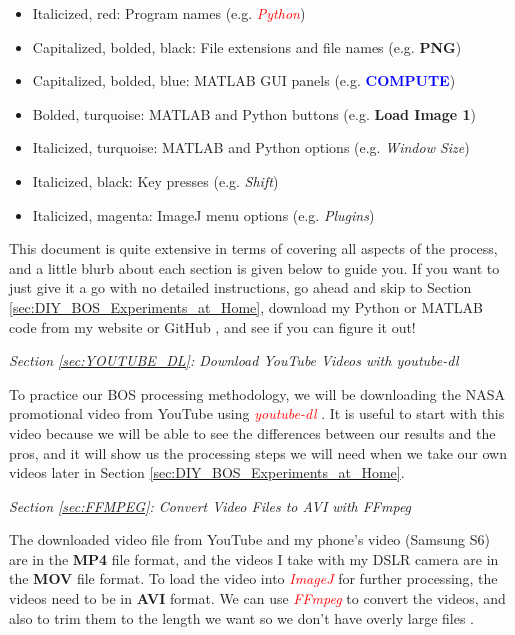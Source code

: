 \documentclass[letterpaper,12pt]{article}
\begin{document}
\begin{itemize}
\item Italicized, red: Program names (e.g. \textcolor{red}{\textit{Python}})
\item Capitalized, bolded, black: File extensions and file names (e.g. \textbf{PNG})
\item Capitalized, bolded, blue: MATLAB GUI panels (e.g. \textcolor{blue}{\textbf{COMPUTE}})
\item Bolded, turquoise: MATLAB and Python buttons (e.g. \textcolor{myBlue}{\textbf{Load Image 1}})
\item Italicized, turquoise: MATLAB and Python options (e.g. \textcolor{myBlue}{\textit{Window Size}})
\item Italicized, black: Key presses (e.g. \textit{Shift})
\item Italicized, magenta: ImageJ menu options (e.g. \textcolor{myMagenta}{\textit{Plugins}})
\end{itemize}

This document is quite extensive in terms of covering all aspects of the process, and a little blurb about each section is given below to guide you.  If you want to just give it a go with no detailed instructions, go ahead and skip to Section \ref{sec:DIY_BOS_Experiments_at_Home}, download my Python or MATLAB code from my website \cite{JTE_Website} or GitHub \cite{JTE_GitHub}, and see if you can figure it out!

\vspace{1em}
\noindent \emph{Section \ref{sec:YOUTUBE_DL}: Download YouTube Videos with \textit{youtube-dl}}
\vspace{1em}

To practice our BOS processing methodology, we will be downloading the NASA promotional video from YouTube using \textcolor{red}{\textit{youtube-dl}} \cite{youtube-dl}.  It is useful to start with this video because we will be able to see the differences between our results and the pros, and it will show us the processing steps we will need when we take our own videos later in Section \ref{sec:DIY_BOS_Experiments_at_Home}.

\vspace{1em}
\noindent \emph{Section \ref{sec:FFMPEG}: Convert Video Files to AVI with \textit{FFmpeg}}
\vspace{1em}

The downloaded video file from YouTube and my phone's video (Samsung S6) are in the \textbf{MP4} file format, and the videos I take with my DSLR camera are in the \textbf{MOV} file format.  To load the video into \textcolor{red}{\textit{ImageJ}} for further processing, the videos need to be in \textbf{AVI} format.  We can use \textcolor{red}{\textit{FFmpeg}} to convert the videos, and also to trim them to the length we want so we don't have overly large files \cite{ffmpeg}.
\end{document}

